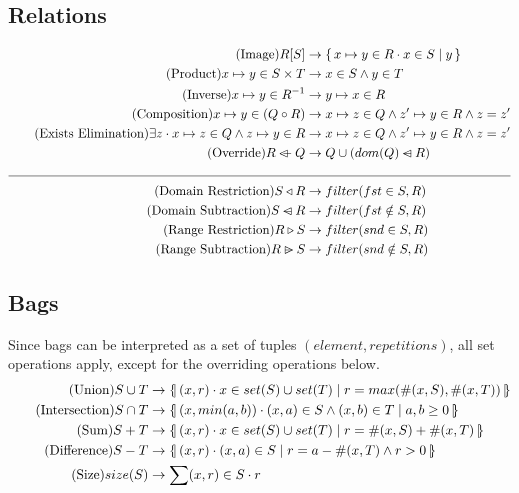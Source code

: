 \documentclass{article}
\newcommand{\bSet}[3]{%
  \{\, #1 \cdot #2 \mid #3 \, \}%
}
\newcommand{\lbbar}{\{\kern-0.5ex|}
\newcommand{\rbbar}{|\kern-0.5ex\}}
\newcommand{\bag}[3]{%
  \lbbar \, #1 \cdot #2 \mid #3 \, \rbbar%
}
\begin{document}
\subsection{Relations}
  \begin{align}
  \tag{Image}
  R[S] &\rightarrow \bSet{x \mapsto y \in R}{x \in S}{y}
  \\
  \tag{Product}
  x \mapsto y \in S \times T &\rightarrow x \in S \land y \in T
  \\
  \tag{Inverse}
  x \mapsto y \in R^{-1} &\rightarrow y \mapsto x \in R
  \\
  \tag{Composition}
  x \mapsto y \in (Q \circ R) &\rightarrow x \mapsto z \in Q \land z' \mapsto y \in R \land z=z'
  \\
  \tag{Exists Elimination}
  \exists z \cdot x \mapsto z \in Q \land z \mapsto y \in R &\rightarrow x \mapsto z \in Q \land z' \mapsto y \in R \land z=z'
  \\
  \tag{Override}
  R \ovl Q &\rightarrow Q \cup (dom(Q) \domsub R)
  \\
  \cline{1-2}
  \tag{Domain Restriction}
  S \triangleleft R &\rightarrow filter(fst \in S, R)
  \\
  \tag{Domain Subtraction}
  S \domsub R &\rightarrow filter(fst \notin S, R)
  \\
  \tag{Range Restriction}
  R \triangleright S &\rightarrow filter(snd \in S, R)
  \\
  \tag{Range Subtraction}
  R \ransub S &\rightarrow filter(snd \notin S, R)
\end{align}

\subsection{Bags}
Since bags can be interpreted as a set of tuples $(element, repetitions)$, all set operations apply, except for the overriding operations below.
\begin{align}
  \tag{Union}
  S \cup T &\rightarrow \bag{(x, r)}{x \in set(S) \cup set(T)}{r = max(\#(x,S), \#(x,T))}
  \\
  \tag{Intersection}
  S \cap T &\rightarrow \bag{(x, min(a,b))}{(x,a) \in S \land (x,b) \in T}{a, b \geq 0}
  \\
  \tag{Sum}
  S + T &\rightarrow \bag{(x, r)}{x \in set(S) \cup set(T)}{r = \#(x,S) + \#(x, T)}
  \\
  \tag{Difference}
  S - T &\rightarrow \bag{(x, r)}{(x,a) \in S}{r = a-\#(x, T) \land r > 0}
  \\
  \tag{Size}
  size(S) &\rightarrow \sum (x,r) \in S \cdot r
\end{align}
\end{document}
